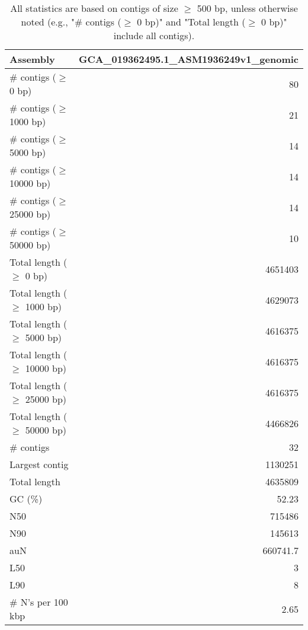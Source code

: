 \documentclass[12pt,a4paper]{article}
\begin{document}
\begin{table}[ht]
\begin{center}
\caption{All statistics are based on contigs of size $\geq$ 500 bp, unless otherwise noted (e.g., "\# contigs ($\geq$ 0 bp)" and "Total length ($\geq$ 0 bp)" include all contigs).}
\begin{tabular}{|l*{1}{|r}|}
\hline
Assembly & GCA\_019362495.1\_ASM1936249v1\_genomic \\ \hline
\# contigs ($\geq$ 0 bp) & 80 \\ \hline
\# contigs ($\geq$ 1000 bp) & 21 \\ \hline
\# contigs ($\geq$ 5000 bp) & 14 \\ \hline
\# contigs ($\geq$ 10000 bp) & 14 \\ \hline
\# contigs ($\geq$ 25000 bp) & 14 \\ \hline
\# contigs ($\geq$ 50000 bp) & 10 \\ \hline
Total length ($\geq$ 0 bp) & 4651403 \\ \hline
Total length ($\geq$ 1000 bp) & 4629073 \\ \hline
Total length ($\geq$ 5000 bp) & 4616375 \\ \hline
Total length ($\geq$ 10000 bp) & 4616375 \\ \hline
Total length ($\geq$ 25000 bp) & 4616375 \\ \hline
Total length ($\geq$ 50000 bp) & 4466826 \\ \hline
\# contigs & 32 \\ \hline
Largest contig & 1130251 \\ \hline
Total length & 4635809 \\ \hline
GC (\%) & 52.23 \\ \hline
N50 & 715486 \\ \hline
N90 & 145613 \\ \hline
auN & 660741.7 \\ \hline
L50 & 3 \\ \hline
L90 & 8 \\ \hline
\# N's per 100 kbp & 2.65 \\ \hline
\end{tabular}
\end{center}
\end{table}
\end{document}
